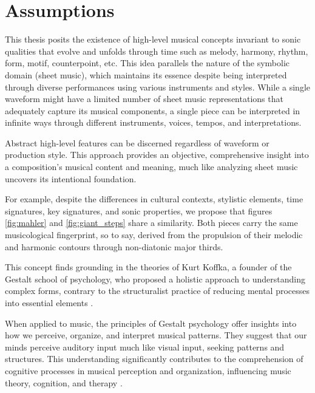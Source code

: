 \section{Assumptions}

This thesis posits the existence of high-level musical concepts invariant to sonic qualities that evolve and unfolds through time such as melody, harmony, rhythm, form, motif, counterpoint, etc. This idea parallels the nature of the symbolic domain (sheet music), which maintains its essence despite being interpreted through diverse performances using various instruments and styles. While a single waveform might have a limited number of sheet music representations that adequately capture its musical components, a single piece can be interpreted in infinite ways through different instruments, voices, tempos, and interpretations. 

Abstract high-level features can be discerned regardless of waveform or production style. This approach provides an objective, comprehensive insight into a composition's musical content and meaning, much like analyzing sheet music uncovers its intentional foundation.

For example, despite the differences in cultural contexts, stylistic elements, time signatures, key signatures, and sonic properties, we propose that figures \ref{fig:mahler} and \ref{fig:giant_steps} share a similarity. Both pieces carry the same musicological fingerprint, so to say, derived from the propulsion of their melodic and harmonic contours through non-diatonic major thirds.

This concept finds grounding in the theories of Kurt Koffka, a founder of the Gestalt school of psychology, who proposed a holistic approach to understanding complex forms, contrary to the structuralist practice of reducing mental processes into essential elements \cite{Koffka2013PrinciplesPsychology}.

When applied to music, the principles of Gestalt psychology offer insights into how we perceive, organize, and interpret musical patterns. They suggest that our minds perceive auditory input much like visual input, seeking patterns and structures. This understanding significantly contributes to the comprehension of cognitive processes in musical perception and organization, influencing music theory, cognition, and therapy \cite{Lerdahl1985AMusic}.

